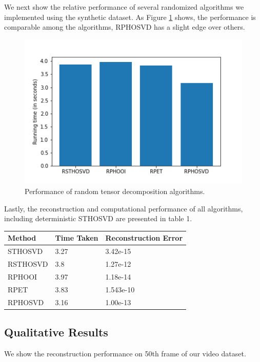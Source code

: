 \documentclass[preprint]{elsarticle}
\begin{document}
We next show the relative performance of several randomized algorithms we implemented using the synthetic dataset. As Figure \ref{fig:booh} shows, the performance is comparable among the algorithms, RPHOSVD has a slight edge over others. 

\begin{figure}
    \centering
    \includegraphics[scale=.7]{figs/runtime.png}
    \caption{Performance of random tensor decomposition algorithms.}
    \label{fig:booh}
\end{figure}

Lastly, the reconstruction and computational performance of all algorithms, including deterministic STHOSVD are presented in table 1.

\begin{center}
\begin{tabular}{lll}
\toprule
  Method & Time Taken & Reconstruction Error \\
\midrule
 STHOSVD &       3.27 &             3.42e-15 \\
RSTHOSVD &        3.8 &             1.27e-12 \\
  RPHOOI &       3.97 &             1.18e-14 \\
    RPET &       3.83 &            1.543e-10 \\
 RPHOSVD &       3.16 &             1.00e-13 \\
\bottomrule
\end{tabular}
\end{center}

\subsection{Qualitative Results}
We show the reconstruction performance on 50th frame of our video dataset.
\end{document}
